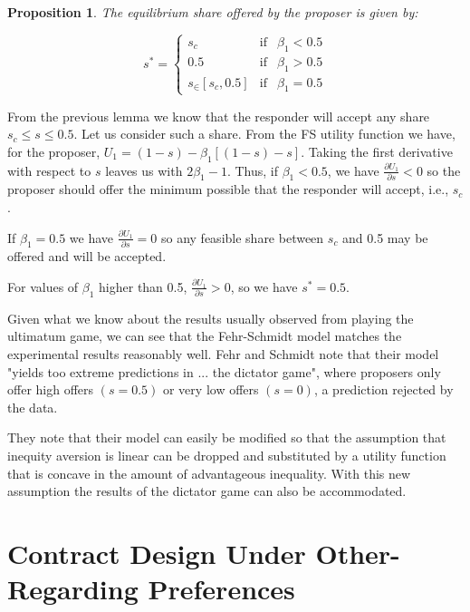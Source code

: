 \documentclass[12pt]{article}
\newtheorem{prop}{Proposition}
\begin{document}
\begin{prop}
	The equilibrium share offered by the proposer is given by:
	
	\begin{equation}
		s^* =\left\{\begin{matrix}
		s_c & \text{if} & \beta_1 <0.5\\ 
		0.5 & \text{if}&\beta_1 >0.5\\ 
		s_ \in \left[s_c,0.5 \right] & \text{if}&\beta_1 =0.5
		\end{matrix}\right.
	\end{equation}	
\end{prop}

From the previous lemma we know that the responder will accept any share $s_c \leq s \leq 0.5$.  Let us consider such a share. From the FS utility function we have, for the proposer, $U_1 = \left(1-s\right) - \beta_1 \left[\left(1-s\right)-s\right]$. Taking the first derivative with respect to $s$ leaves us with $2\beta_1 -1$. Thus, if $\beta_1 < 0.5$, we have $\frac{\partial U_1}{\partial s}<0$ so the proposer should offer the minimum possible that the responder will accept, i.e., $s_c$.

If $\beta_1 = 0.5$ we have $\frac{\partial U_1}{\partial s}=0$ so any feasible share between $s_c$ and 0.5 may be offered and will be accepted.

For values of $\beta_1$ higher than 0.5, $\frac{\partial U_1}{\partial s}>0$, so we have $s^* = 0.5$.

Given what we know about the results usually observed from playing the ultimatum game, we can see that the Fehr-Schmidt model matches the experimental results reasonably well. Fehr and Schmidt note that their model "yields too extreme predictions in ... the dictator game", where proposers only offer high offers $\left(s = 0.5\right)$ or very low offers $\left(s = 0\right)$, a prediction rejected by the data. 

They note that their model can easily be modified so that the assumption that inequity aversion is linear can be dropped and substituted by a utility function that is concave in the amount of advantageous inequality. With this new assumption the results of the dictator game can also be accommodated. 

\section{Contract Design Under Other-Regarding Preferences}
\end{document}
